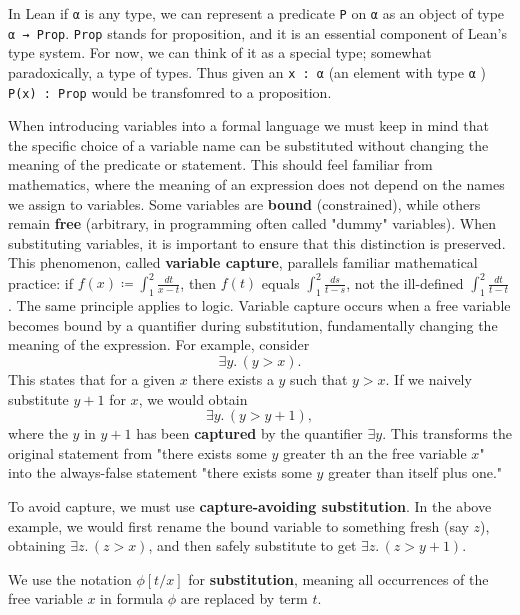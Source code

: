 In Lean if \lstinline[language=lean]|α| is any type, we can represent a 
predicate \lstinline[language=lean]|P| on \lstinline[language=lean]|α| as 
an object of type \lstinline[language=lean]|α → Prop|.
\lstinline[language=lean]|Prop| stands for proposition, and it is an 
essential component of Lean’s type system.
For now, we can think of it as a special type; somewhat 
paradoxically, a type of types. 
Thus given an \lstinline[language=lean]|x : α| (an element
with type \lstinline[language=lean]|α| ) 
\lstinline[language=lean]|P(x) : Prop| would be transfomred to a proposition.

When introducing variables into a formal language we must keep in mind that the specific choice 
of a variable name can be substituted without 
changing the meaning of the predicate or statement. This should feel familiar from mathematics, 
where the meaning of an expression does not depend on the names we assign to variables.
Some variables are \textbf{bound} (constrained), while others remain \textbf{free} 
(arbitrary, in programming often called "dummy" variables). 
When substituting variables, it is important to ensure that this distinction is preserved.
This phenomenon, called \textbf{variable capture}, parallels familiar mathematical practice: 
if $f(x) \coloneqq \int_1^2 \frac{dt}{x-t}$, then $f(t)$ equals $\int_1^2 \frac{ds}{t-s}$, 
not the ill-defined $\int_1^2 \frac{dt}{t-t}$. The same principle applies to logic.
Variable capture occurs when a free variable becomes bound by a quantifier during substitution, 
fundamentally changing the meaning of the expression. For example, consider
\[
\exists y.\,(y > x).
\]
This states that for a given $x$ there exists a $y$ such that $y > x$. 
If we naively substitute $y+1$ for $x$, we would obtain
\[
\exists y.\,(y > y+1),
\]
where the $y$ in $y+1$ has been \textbf{captured} by the quantifier $\exists y$. 
This transforms the original statement from "there exists some $y$ greater th
an the free variable $x$" into the always-false statement 
"there exists some $y$ greater than itself plus one."

To avoid capture, we must use \textbf{capture-avoiding substitution}. 
In the above example, we would first rename the bound variable to something fresh 
(say $z$), obtaining $\exists z.\,(z > x)$, and then safely substitute to get $\exists z.\,(z > y+1)$.

We use the notation $\phi[t/x]$ for \textbf{substitution}, meaning all occurrences of the free 
variable $x$ in formula $\phi$ are replaced by term $t$.

